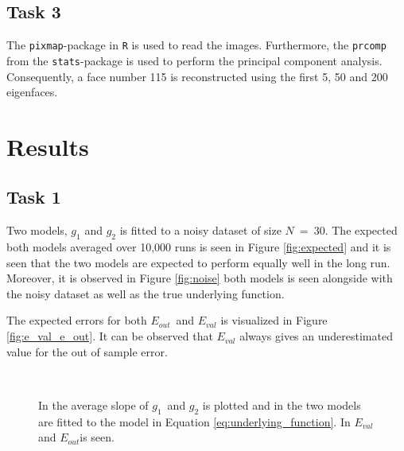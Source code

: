 \documentclass[a4paper,10pt]{article}
\begin{document}
\subsection{Task 3}
The \texttt{pixmap}-package in \texttt{R} is used to read the images. Furthermore, the
\texttt{prcomp} from the \texttt{stats}-package is used to perform
the principal component analysis. Consequently, a face number 115 is
reconstructed using the first 5, 50 and 200 eigenfaces.

\section{Results}
\subsection{Task 1}
Two models, $g_1$ and $g_2$ is fitted to a noisy dataset of size $N\ =\ 30$. The expected
both models averaged over 10,000 runs is seen in Figure {\ref{fig:expected}} and it is seen
that the two models are expected to perform equally well in the long run. Moreover, it is observed
in Figure {\ref{fig:noise}} both models is seen alongside with the noisy dataset as well
as the true underlying function. \newline

The expected errors for both $E_{out}$ and $E_{val}$ is visualized in Figure {\ref{fig:e_val_e_out}}.
It can be observed that $E_{val}$ always gives an underestimated value for
the out of sample error.

\begin{figure}[H]
   \\
  \centering
  \caption{In \protect {} the average slope of $g_1$ and $g_2$ is plotted and in \protect {}
  the two models are fitted to the model in Equation {\ref{eq:underlying_function}}. In \protect {} $E_{val}$ and $E_{out}$is seen. }
\end{figure}
\end{document}
